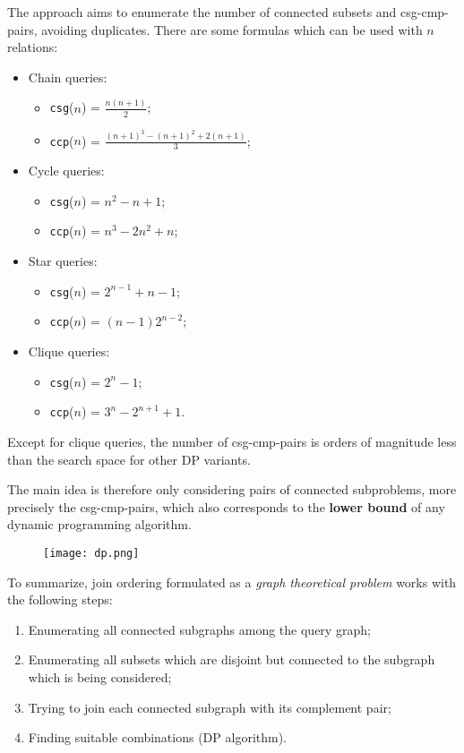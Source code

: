 The approach aims to enumerate the number of connected subsets and csg-cmp-pairs, avoiding duplicates. There are some formulas which can be used with $n$ relations:
\begin{itemize}
	\item Chain queries:
	\begin{itemize}
		\item \texttt{csg}($n$) = $\frac{n(n+1)}{2}$;
		\item \texttt{ccp}($n$) = $\frac{(n+1)^3 - (n+1)^2 + 2(n+1)}{3}$;
	\end{itemize}
	\item Cycle queries:
	\begin{itemize}
		\item \texttt{csg}($n$) = $n^2 - n + 1$;
		\item \texttt{ccp}($n$) = $n^3 - 2n^2 + n$;
	\end{itemize}
	\item Star queries:
	\begin{itemize}
		\item \texttt{csg}($n$) = $2^{n-1} + n - 1$;
		\item \texttt{ccp}($n$) = $(n-1)2^{n-2}$;
	\end{itemize}
	\item Clique queries:
	\begin{itemize}
		\item \texttt{csg}($n$) = $2^n - 1$;
		\item \texttt{ccp}($n$) = $3^n - 2^{n+1} + 1$.
	\end{itemize}
\end{itemize}
Except for clique queries, the number of csg-cmp-pairs is orders of magnitude less than the search space for other DP variants.

The main idea is therefore only considering pairs of connected subproblems, more precisely the csg-cmp-pairs, which also corresponds to the \textbf{lower bound} of any dynamic programming algorithm. 

\begin{figure}[h]
	\texttt{[image: dp.png]}
	\centering
\end{figure}

To summarize, join ordering formulated as a \textit{graph theoretical problem} works with the following steps:

\begin{enumerate}
	\item Enumerating all connected subgraphs among the query graph;
	\item Enumerating all subsets which are disjoint but connected to the subgraph which is being considered;
	\item Trying to join each connected subgraph with its complement pair;
	\item Finding suitable combinations (DP algorithm).
\end{enumerate}


